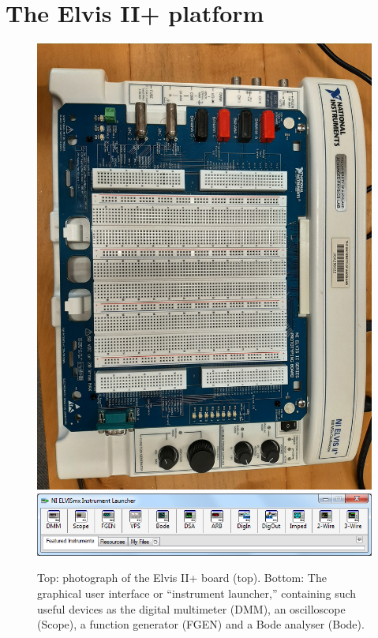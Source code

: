 \documentclass{article}
\begin{document}
\section*{The Elvis II+ platform}
\begin{figure}
  \centering
  \includegraphics[width=\columnwidth]{images/elvisIIplus.jpg}
  \includegraphics[width=\columnwidth]{launcher.png}
  \caption{Top: photograph of the Elvis II+ board (top). Bottom: The
    graphical user interface or ``instrument launcher,'' containing
    such useful devices as the digital multimeter (DMM), an
    oscilloscope (Scope), a function generator (FGEN) and a Bode
    analyser (Bode).}
  \label{fig:elvisii}
\end{figure}
\end{document}

